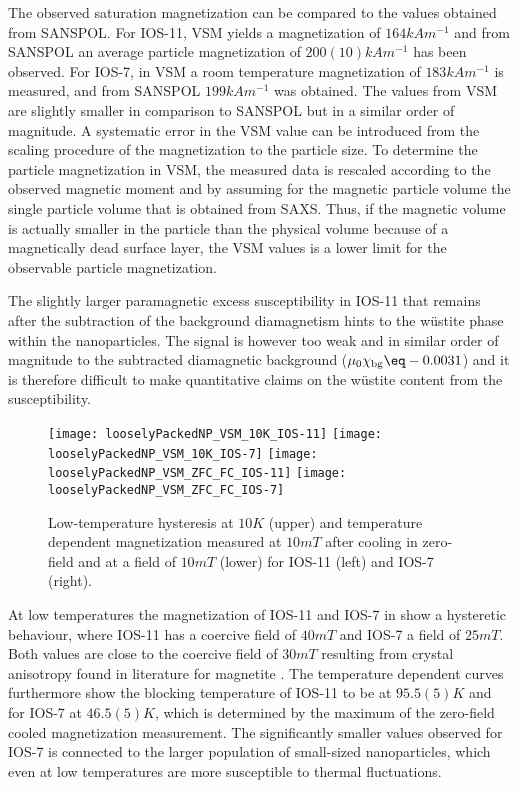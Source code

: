 \documentclass[\main/dresen_thesis.tex]{subfiles}
\begin{document}
  The observed saturation magnetization can be compared to the values obtained from SANSPOL.
  For IOS-11, VSM yields a magnetization of $164 \unit{kA m^{-1}}$ and from SANSPOL an average particle magnetization of $200(10)\unit{kA m^{-1}}$ has been observed.
  For IOS-7, in VSM a room temperature magnetization of $183 \unit{kA m^{-1}}$ is measured, and from SANSPOL $199\unit{kA m^{-1}}$ was obtained.
  The values from VSM are slightly smaller in comparison to SANSPOL but in a similar order of magnitude.
  A systematic error in the VSM value can be introduced from the scaling procedure of the magnetization to the particle size.
  To determine the particle magnetization in VSM, the measured data is rescaled according to the observed magnetic moment and by assuming for the magnetic particle volume the single particle volume that is obtained from SAXS.
  Thus, if the magnetic volume is actually smaller in the particle than the physical volume \eg because of a magnetically dead surface layer, the VSM values is a lower limit for the observable particle magnetization.

  The slightly larger paramagnetic excess susceptibility in IOS-11 that remains after the subtraction of the background diamagnetism hints to the w\"ustite phase within the nanoparticles.
  The signal is however too weak and in similar order of magnitude to the subtracted diamagnetic background ($\mu_0 \chi_\mathrm{bg} \eq -0.0031$) and it is therefore difficult to make quantitative claims on the w\"ustite content from the susceptibility.

  \begin{figure}[tb]
    \centering
    \texttt{[image: looselyPackedNP\_VSM\_10K\_IOS-11]}
    \texttt{[image: looselyPackedNP\_VSM\_10K\_IOS-7]}
    \texttt{[image: looselyPackedNP\_VSM\_ZFC\_FC\_IOS-11]}
    \texttt{[image: looselyPackedNP\_VSM\_ZFC\_FC\_IOS-7]}
    \caption{\label{fig:looselyPackedNP:nanoparticle:vsm10}Low-temperature hysteresis at $10 \unit{K}$ (upper) and temperature dependent magnetization measured at $10 \unit{mT}$ after cooling in zero-field and at a field of $10 \unit{mT}$ (lower) for IOS-11 (left) and IOS-7 (right).}
  \end{figure}
  At low temperatures the magnetization of IOS-11 and IOS-7 in  show a hysteretic behaviour, where IOS-11 has a coercive field of $40 \unit{mT}$ and IOS-7 a field of $25 \unit{mT}$.
  Both values are close to the coercive field of $30 \unit{mT}$ resulting from crystal anisotropy found in literature for magnetite \cite{Cornell_2003_Their}.
  The temperature dependent curves furthermore show the blocking temperature of IOS-11 to be at $95.5(5) \unit{K}$ and for IOS-7 at $46.5(5) \unit{K}$, which is determined by the maximum of the zero-field cooled magnetization measurement.
  The significantly smaller values observed for IOS-7 is connected to the larger population of small-sized nanoparticles, which even at low temperatures are more susceptible to thermal fluctuations.
\end{document}
